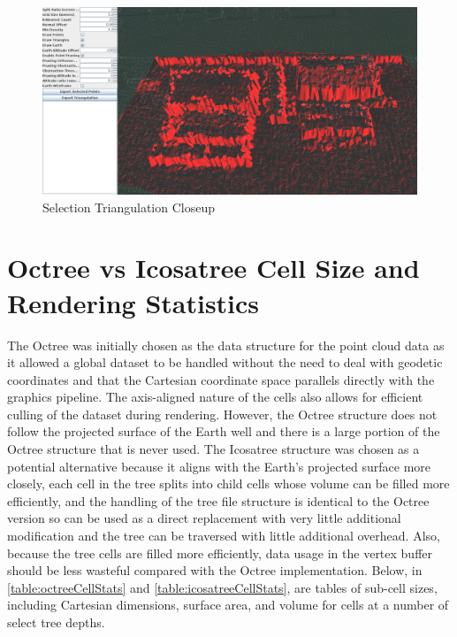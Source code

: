 \begin{figure}[htp]
\begin{center}
  \includegraphics[width=6.0in]{images/triangulation4.png}
  \caption{Selection Triangulation Closeup}
  \label{fig:triangulation4}
\end{center}
\end{figure}

\section{Octree vs Icosatree Cell Size and Rendering Statistics}

The Octree was initially chosen as the data structure for the point cloud data
as it allowed a global dataset to be handled without the need to deal with
geodetic coordinates and that the Cartesian coordinate space parallels directly
with the graphics pipeline. The axis-aligned nature of the cells also allows for
efficient culling of the dataset during rendering. However, the Octree structure
does not follow the projected surface of the Earth well and there is a large
portion of the Octree structure that is never used. The Icosatree structure was
chosen as a potential alternative because it aligns with the Earth’s projected
surface more closely, each cell in the tree splits into child cells whose volume
can be filled more efficiently, and the handling of the tree file structure is
identical to the Octree version so can be used as a direct replacement with very
little additional modification and the tree can be traversed with little
additional overhead. Also, because the tree cells are filled more efficiently,
data usage in the vertex buffer should be less wasteful compared with the Octree
implementation. Below, in \ref{table:octreeCellStats} and
\ref{table:icosatreeCellStats}, are tables of sub-cell sizes, including
Cartesian dimensions, surface area, and volume for cells at a number of select
tree depths.

